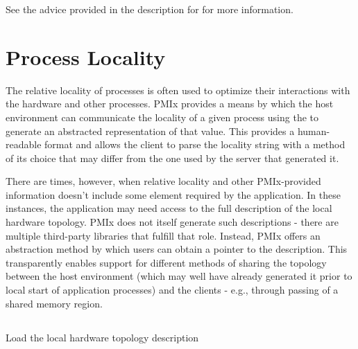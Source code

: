 See the advice provided in the description for  for more information.


\section{Process Locality}
\label{chap:api_proc_mgmt:locality}

The relative locality of processes is often used to optimize their interactions with the hardware and other processes. \ac{PMIx} provides a means by which the host environment can communicate the locality of a given process using the  to generate an abstracted representation of that value. This provides a human-readable format and allows the client to parse the locality string with a method of its choice that may differ from the one used by the server that generated it.

There are times, however, when relative locality and other \ac{PMIx}-provided
information doesn't include some element required by the application. In these
instances, the application may need access to the full description of the
local hardware topology. \ac{PMIx} does not itself generate such descriptions
- there are multiple third-party libraries that fulfill that role. Instead,
\ac{PMIx} offers an abstraction method by which users can obtain a pointer to
the description. This transparently enables support for different methods of
sharing the topology between the host environment (which may well have already
generated it prior to local start of application processes) and the clients -
e.g., through passing of a shared memory region.

\subsection{}

\summary

Load the local hardware topology description

\format


\begin{arglist}
\end{arglist}

